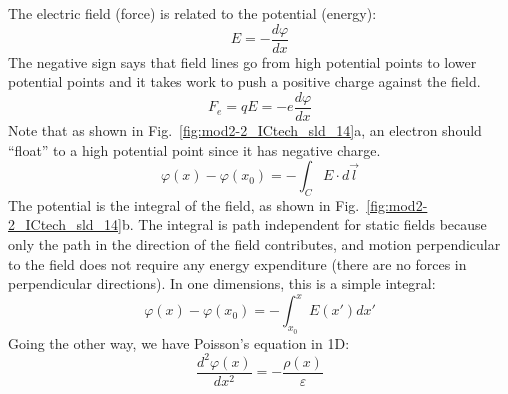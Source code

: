 The electric field (force) is related to the potential (energy):
%
\begin{equation} 
	E =  - \frac{{d\varphi }}{{dx}} 
\end{equation}
%
The negative sign says that field lines go from high potential points to lower potential points and it takes work to push a positive charge against the field.
%
\begin{equation} 
	{F_e} = qE =  - e\frac{{d\varphi }}{{dx}} 
\end{equation}
%
Note that as shown in Fig.~\ref{fig:mod2-2_ICtech_sld_14}a, an electron should “float” to a high potential point since it has negative charge.   
\begin{equation} 
	\varphi (x) - \varphi ({x_0}) =  - \int_C {E \cdot d\vec l} 
\end{equation}
The potential is the integral of the field, as shown in Fig.~\ref{fig:mod2-2_ICtech_sld_14}b.  The integral is path independent for static fields because only the path in the direction of the field contributes, and motion perpendicular to the field does not require any energy expenditure (there are no forces in perpendicular directions).    In one dimensions, this is a simple integral:
%
\begin{equation} 
	\varphi (x) - \varphi ({x_0}) =  - \int_{{x_0}}^x {E(x')dx'}  
\end{equation}
%
Going the other way, we have Poisson’s equation in 1D:
%
\begin{equation} 
	\frac{{{d^2}\varphi (x)}}{{d{x^2}}} =  - \frac{{\rho (x)}}{\varepsilon }
\end{equation}
 

